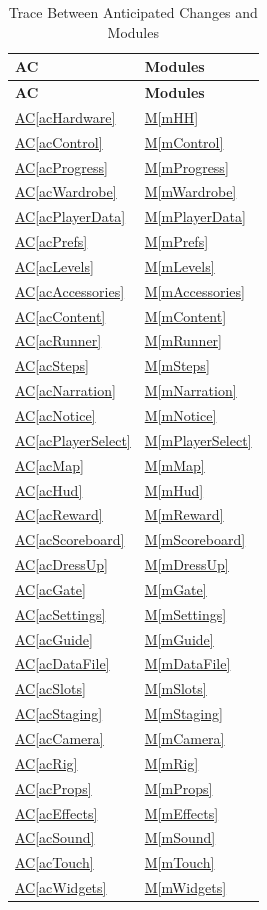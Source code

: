 \documentclass[12pt, titlepage]{article}
\newcommand{\acref}[1]{\hyperref[#1]{AC\ref*{#1}}}
\newcommand{\mref}[1]{\hyperref[#1]{M\ref*{#1}}}
\begin{document}
\begin{longtable}{p{} p{}}
\caption{Trace Between Anticipated Changes and Modules} \label{TblACT}\\
\toprule
\textbf{AC} & \textbf{Modules}\\
\midrule
\endfirsthead
\toprule
\textbf{AC} & \textbf{Modules}\\
\midrule
\endhead
\acref{acHardware} & \mref{mHH}\\
\acref{acControl} & \mref{mControl}\\
\acref{acProgress} & \mref{mProgress}\\
\acref{acWardrobe} & \mref{mWardrobe}\\
\acref{acPlayerData} & \mref{mPlayerData}\\
\acref{acPrefs} & \mref{mPrefs}\\
\acref{acLevels} & \mref{mLevels}\\
\acref{acAccessories} & \mref{mAccessories}\\
\acref{acContent} & \mref{mContent}\\
\acref{acRunner} & \mref{mRunner}\\
\acref{acSteps} & \mref{mSteps}\\
\acref{acNarration} & \mref{mNarration}\\
\acref{acNotice} & \mref{mNotice}\\
\acref{acPlayerSelect} & \mref{mPlayerSelect}\\
\acref{acMap} & \mref{mMap}\\
\acref{acHud} & \mref{mHud}\\
\acref{acReward} & \mref{mReward}\\
\acref{acScoreboard} & \mref{mScoreboard}\\
\acref{acDressUp} & \mref{mDressUp}\\
\acref{acGate} & \mref{mGate}\\
\acref{acSettings} & \mref{mSettings}\\
\acref{acGuide} & \mref{mGuide}\\
\acref{acDataFile} & \mref{mDataFile}\\
\acref{acSlots} & \mref{mSlots}\\
\acref{acStaging} & \mref{mStaging}\\
\acref{acCamera} & \mref{mCamera}\\
\acref{acRig} & \mref{mRig}\\
\acref{acProps} & \mref{mProps}\\
\acref{acEffects} & \mref{mEffects}\\
\acref{acSound} & \mref{mSound}\\
\acref{acTouch} & \mref{mTouch}\\
\acref{acWidgets} & \mref{mWidgets}\\
\bottomrule
\end{longtable}
\end{document}

